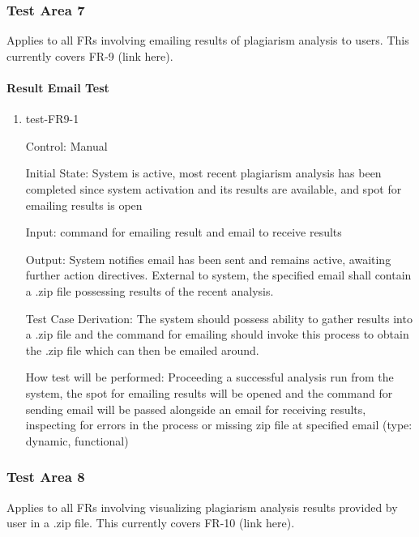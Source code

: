 \documentclass[12pt, titlepage]{article}
\begin{document}
\subsubsection{Test Area 7}

Applies to all FRs involving emailing results of plagiarism analysis to users. 
This currently covers FR-9 (link here).

\paragraph{Result Email Test}

\begin{enumerate}

\item{test-FR9-1\\}

Control: Manual
					
Initial State: System is active, most recent plagiarism analysis has been 
completed since system activation and its results are available, and spot 
for emailing results is open
					
Input: command for emailing result and email to receive results
					
Output: System notifies email has been sent and remains active, awaiting 
further action directives. External to system, the specified email shall
contain a .zip file possessing results of the recent analysis.

Test Case Derivation: The system should possess ability to gather results
into a .zip file and the command for emailing should invoke this process
to obtain the .zip file which can then be emailed around.

How test will be performed: Proceeding a successful analysis run from the system,
the spot for emailing results will be opened and the command for sending email 
will be passed alongside an email for receiving results, inspecting for errors 
in the process or missing zip file at specified email (type: dynamic, 
functional)		
					

\end{enumerate}

\subsubsection{Test Area 8}

Applies to all FRs involving visualizing plagiarism analysis results provided 
by user in a .zip file. This currently covers FR-10 (link here).
\end{document}
